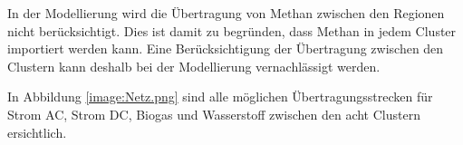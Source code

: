 In der Modellierung wird die Übertragung von Methan zwischen den Regionen nicht berück\-sichtigt. Dies ist damit zu begründen, dass Methan in jedem Cluster importiert werden kann. Eine Berücksichtigung der Übertragung zwischen den Clustern kann deshalb bei der Modellierung vernachlässigt werden.

In Abbildung \ref{image:Netz.png} sind alle möglichen Übertragungsstrecken für Strom AC, Strom DC, Biogas und Wasserstoff zwischen den acht Clustern ersichtlich.


